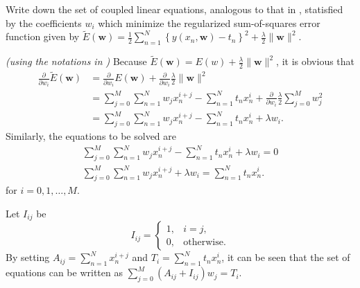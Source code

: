 \begin{question}{1.2}
	Write down the set of coupled linear equations, analogous to that in , statisfied by the coefficients $w_i$ which minimize the regularized sum-of-squares error function given by $\tilde{E}(\bm{w}) = \frac{1}{2} \sum_{n=1}^{N} \left\{ y(x_n, \bm{w}) - t_n\right\}^2 + \frac{\lambda}{2} \lVert\bm{w}\rVert^2$.
\end{question}

\begin{answer}{}
	\emph{(using the notations in )} Because $\tilde{E}(\bm{w}) = E(w) + \frac{\lambda}{2}\lVert\bm{w}\rVert^2$, it is obvious that
	\begin{align}
	\frac{\partial}{\partial w_i} \tilde{E}(\bm{w}) &= \frac{\partial}{\partial w_i} E(\bm{w}) + \frac{\partial}{\partial w_i}\frac{\lambda}{2}\lVert\bm{w}\rVert^2\\
		&= \sum_{j = 0}^{M} \sum_{n=1}^{N} w_j x_n^{i+j} - \sum_{n=1}^{N} t_n x_n^i + \frac{\partial}{\partial w_i}\frac{\lambda}{2}\sum_{j=0}^{M}w_j^2\\
		&= \sum_{j = 0}^{M} \sum_{n=1}^{N} w_j x_n^{i+j} - \sum_{n=1}^{N} t_n x_n^i + \lambda w_i.
	\end{align}
	Similarly, the equations to be solved are
	\begin{gather}
		\sum_{j = 0}^{M} \sum_{n=1}^{N} w_j x_n^{i+j} - \sum_{n=1}^{N} t_n x_n^i + \lambda w_i = 0\\
		\sum_{j = 0}^{M} \sum_{n=1}^{N} w_j x_n^{i+j} + \lambda w_i = \sum_{n=1}^{N} t_n x_n^i.
	\end{gather}
	for $i = 0, 1, \ldots, M$.

	Let $I_{ij}$ be
	\begin{equation}
		I_{ij} =
		\begin{cases}
			1, &i = j,\\
			0, &\mbox{otherwise}.
		\end{cases}
	\end{equation}
	By setting $A_{ij} = \sum_{n=1}^{N} x_n^{i+j}$ and $T_i = \sum_{n=1}^{N} t_n x_n^i$, it can be seen that the set of equations can be written as $\sum_{j = 0}^{M} \left(A_{ij} + I_{ij}\right)w_j = T_i$.
\end{answer}